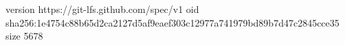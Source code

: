 version https://git-lfs.github.com/spec/v1
oid sha256:1e4754c88b65d2ca2127d5af9eaef303c12977a741979bd89b7d47c2845cce35
size 5678
